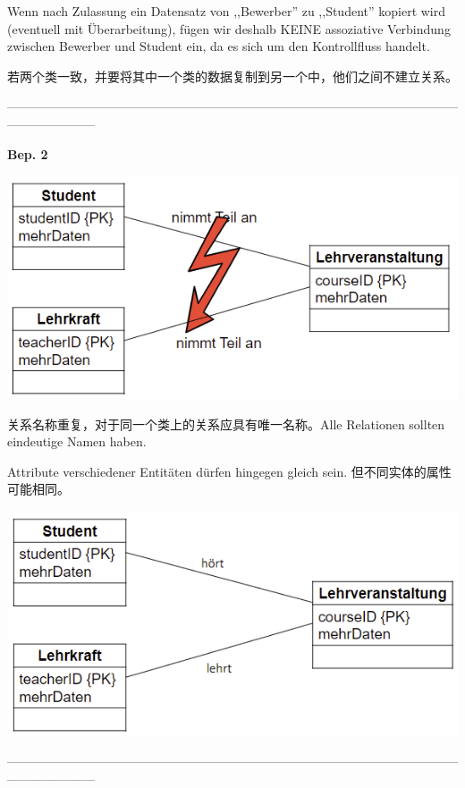 \documentclass[fleqn]{article}
\begin{document}
Wenn nach Zulassung ein Datensatz von ,,Bewerber'' zu ,,Student'' kopiert wird (eventuell mit Überarbeitung), fügen wir deshalb KEINE assoziative Verbindung zwischen Bewerber und Student ein, da es sich um den Kontrollfluss handelt.

若两个类一致，并要将其中一个类的数据复制到另一个中，他们之间不建立关系。

\noindent---------------------------------------------------------------------------------------------------------------------------------

\noindent\textbf{Bep. 2}

\begin{center} 
    \includegraphics[scale=0.5]{9.png}
\end{center}

关系名称重复，对于同一个类上的关系应具有唯一名称。Alle Relationen sollten eindeutige Namen haben.

Attribute verschiedener Entitäten dürfen hingegen gleich sein. 但不同实体的属性可能相同。

\begin{center} 
    \includegraphics[scale=0.5]{10.png}
\end{center}

\noindent---------------------------------------------------------------------------------------------------------------------------------
\end{document}
